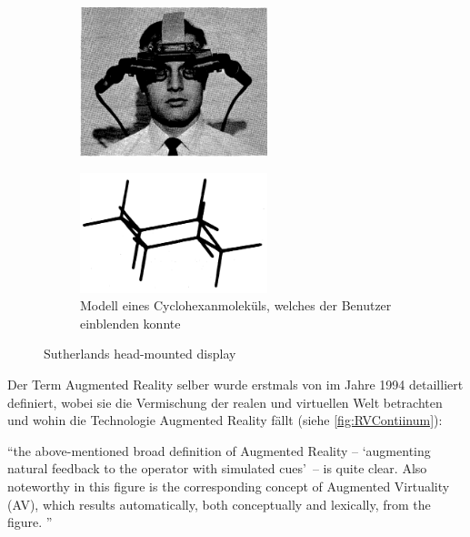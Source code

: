 \documentclass[a4paper]{scrreprt}
\begin{document}
\begin{figure}[h!]
	\centering	
	\begin{subfigure}[b]{0.45\textwidth}
		\centering
		\includegraphics[keepaspectratio, width=0.6\textwidth]{Sutherland_HUD.png}
	\end{subfigure}
	\quad
	\begin{subfigure}[b]{0.45\textwidth}
		\centering
		\includegraphics[keepaspectratio, width=0.6\textwidth]{cyclo-hexane_molecule.png}
		\caption{Modell eines Cyclohexanmoleküls, welches der Benutzer einblenden konnte}
	\end{subfigure}
	\caption{Sutherlands head-mounted display}
	\label{fig:FirstHUD}
\end{figure}

Der Term Augmented Reality selber wurde erstmals von \citeauthor{Milgram1994} im Jahre 1994 detailliert definiert, wobei sie die Vermischung der realen und virtuellen Welt betrachten und wohin die Technologie Augmented Reality fällt (siehe \ref{fig:RVContiinum}):

\vspace{1em}

\textquotedblleft the above-mentioned broad definition of Augmented Reality –  \textquoteleft augmenting natural feedback to the operator with simulated cues\textquoteright\ – is quite clear. Also noteworthy in this figure is the corresponding concept of Augmented Virtuality (AV), which results automatically, both conceptually and lexically, from the figure. \textquotedblright\ \parencite{Milgram1994}
\end{document}

